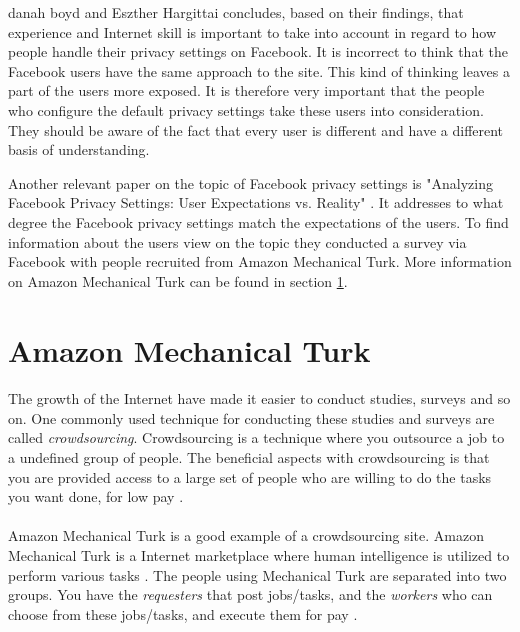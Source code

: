 danah boyd and Eszther Hargittai concludes, based on their findings, that experience and Internet skill is important to take into account in regard to how people handle their privacy settings on Facebook. It is incorrect to think that the Facebook users have the same approach to the site. This kind of thinking leaves a part of the users more exposed. It is therefore very important that the people who configure the default privacy settings take these users into consideration. They should be aware of the fact that every user is different and have a different basis of understanding. 

Another relevant paper on the topic of Facebook privacy settings is "Analyzing Facebook Privacy Settings: User Expectations vs. Reality" \cite{expectations}. It addresses to what degree the Facebook privacy settings match the expectations of the users. To find information about the users view on the topic they conducted a survey via Facebook with people recruited from Amazon Mechanical Turk. More information on Amazon Mechanical Turk can be found in section \ref{sec:amt}.


\section{Amazon Mechanical Turk}\label{sec:amt}
\paragraph{}
The growth of the Internet have made it easier to conduct studies, surveys and so on. One commonly used technique for conducting these studies and surveys are called \emph{crowdsourcing}. Crowdsourcing is a technique where you outsource a job to a undefined group of people. The beneficial aspects with crowdsourcing is that you are provided access to a large set of people who are willing to do the tasks you want done, for low pay \cite{AMT}.

\paragraph{}
Amazon Mechanical Turk is a good example of a crowdsourcing site. Amazon Mechanical Turk is a Internet marketplace where human intelligence is utilized to perform various tasks \cite{amazonweb}. The people using Mechanical Turk are separated into two groups. You have the \emph{requesters} that post jobs/tasks, and the \emph{workers} who can choose from these jobs/tasks, and execute them for pay \cite{AMT}. 

